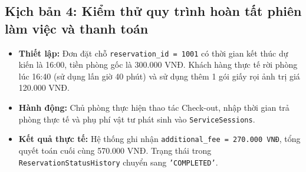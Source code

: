 \subsection{Kịch bản 4: Kiểm thử quy trình hoàn tất phiên làm việc và thanh toán}
\begin{itemize}[leftmargin=2em]
    \item \textbf{Thiết lập:} Đơn đặt chỗ \texttt{reservation\_id = 1001} có thời gian kết thúc dự kiến là 16:00, tiền phòng gốc là 300.000 VNĐ. Khách hàng thực tế rời phòng lúc 16:40 (sử dụng lấn giờ 40 phút) và sử dụng thêm 1 gói giấy rọi ảnh trị giá 120.000 VNĐ.
    \item \textbf{Hành động:} Chủ phòng thực hiện thao tác Check-out, nhập thời gian trả phòng thực tế và phụ phí vật tư phát sinh vào \texttt{ServiceSessions}.
    \item \textbf{Kết quả thực tế:} Hệ thống ghi nhận \texttt{additional\_fee = 270.000 VNĐ}, tổng quyết toán cuối cùng 570.000 VNĐ. Trạng thái trong \texttt{ReservationStatusHistory} chuyển sang \texttt{'COMPLETED'}.
\end{itemize}

